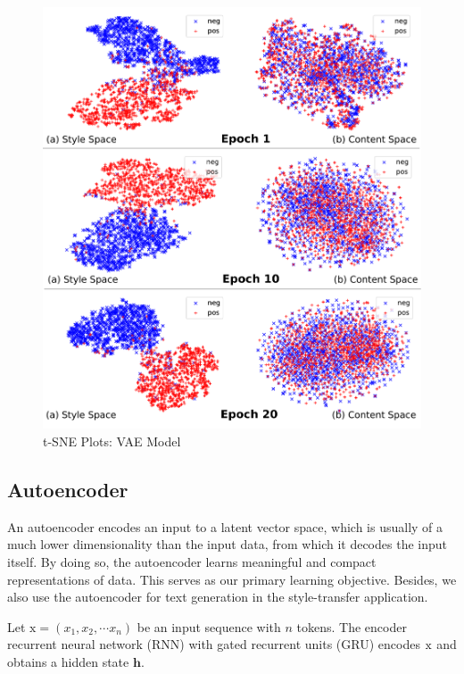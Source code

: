\documentclass[11pt,a4paper]{article}
\newcommand{\rmx}{\mathrm x}
\begin{document}
\begin{figure}[ht]
	\captionsetup{justification=centering}
	\includegraphics[width=\linewidth]{latent-spaces-vae}
	\caption{t-SNE Plots: VAE Model}
	\label{fig:vae-tsne}
\end{figure}


\subsection{Autoencoder} \label{ssec:seq2seq-autoencoder}

An autoencoder encodes an input to a latent vector space, which is usually of a much lower dimensionality than the input data, from which it decodes the input itself. By doing so, the autoencoder learns meaningful and compact representations of data. This serves as our primary learning objective. Besides, we also use the autoencoder for text generation in the style-transfer application.

Let $\rmx=(x_1, x_2, \cdots x_n)$ be an input sequence with $n$ tokens. The encoder recurrent neural network (RNN) with gated recurrent units (GRU) \cite{cho2014learning} encodes $\rm x$ and obtains a hidden state $\bm h$.
\end{document}

